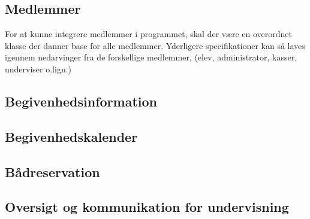 \subsection{Medlemmer}

For at kunne integrere medlemmer i programmet, skal der være en overordnet klasse der danner base for alle
medlemmer. Yderligere specifikationer kan så laves igennem nedarvinger fra de forskellige medlemmer, (elev,
administrator, kasser, underviser o.lign.)


\subsection{Begivenhedsinformation}


\subsection{Begivenhedskalender}


\subsection{Bådreservation}


\subsection{Oversigt og kommunikation for undervisning}
